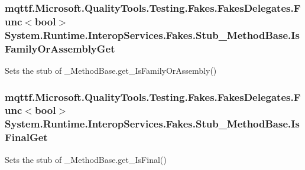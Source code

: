 \hypertarget{class_system_1_1_runtime_1_1_interop_services_1_1_fakes_1_1_stub___method_base_ae5b3c3048fac60accb55fb11f18cb3dd}{
\subsubsection[{Is\-Family\-Or\-Assembly\-Get}]{\setlength{\rightskip}{0pt plus 5cm}mqttf.\-Microsoft.\-Quality\-Tools.\-Testing.\-Fakes.\-Fakes\-Delegates.\-Func$<$bool$>$ System.\-Runtime.\-Interop\-Services.\-Fakes.\-Stub\-\_\-\-Method\-Base.\-Is\-Family\-Or\-Assembly\-Get}}\label{class_system_1_1_runtime_1_1_interop_services_1_1_fakes_1_1_stub___method_base_ae5b3c3048fac60accb55fb11f18cb3dd}


Sets the stub of \-\_\-\-Method\-Base.\-get\-\_\-\-Is\-Family\-Or\-Assembly()

\hypertarget{class_system_1_1_runtime_1_1_interop_services_1_1_fakes_1_1_stub___method_base_aee55ba0e31e16718b75ab367e3cadc29}{
\subsubsection[{Is\-Final\-Get}]{\setlength{\rightskip}{0pt plus 5cm}mqttf.\-Microsoft.\-Quality\-Tools.\-Testing.\-Fakes.\-Fakes\-Delegates.\-Func$<$bool$>$ System.\-Runtime.\-Interop\-Services.\-Fakes.\-Stub\-\_\-\-Method\-Base.\-Is\-Final\-Get}}\label{class_system_1_1_runtime_1_1_interop_services_1_1_fakes_1_1_stub___method_base_aee55ba0e31e16718b75ab367e3cadc29}


Sets the stub of \-\_\-\-Method\-Base.\-get\-\_\-\-Is\-Final()

